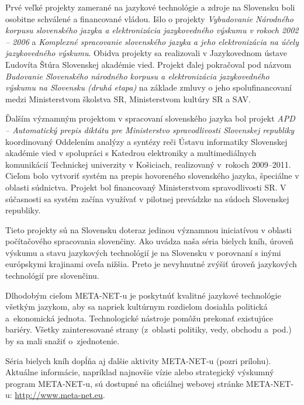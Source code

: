 \begin{multicols}{2}
Prvé veľké projekty zamerané na jazykové technológie a zdroje na Slovensku boli osobitne schválené a financované vládou. Išlo o projekty \emph{Vybudovanie Národného korpusu slovenského jazyka a elektronizácia jazykovedného výskumu v rokoch 2002 -- 2006} a \emph{Komplexné spracovanie slovenského jazyka a jeho elektronizácia na účely jazykovedného výskumu}. Obidva projekty sa realizovali v Jazykovednom ústave Ľudovíta Štúra Slovenskej akadémie vied. Projekt ďalej pokračoval pod názvom \emph{Budovanie Slovenského národného korpusu a elektronizácia jazykovedného výskumu na Slovensku (druhá etapa)} na základe zmluvy o jeho spolufinancovaní medzi Ministerstvom školstva SR, Ministerstvom kultúry SR a SAV.

Ďalším významným projektom v spracovaní slovenského jazyka bol projekt \emph{APD
--  Automatický prepis diktátu pre Ministerstvo spravodlivosti Slovenskej
republiky} koordinovaný Oddelením analýzy a syntézy reči Ústavu informatiky
Slovenskej akadémie vied v spolupráci s Katedrou elektroniky a multimediálnych
komunikácií Technickej univerzity v Košiciach, realizovaný v~rokoch
2009--2011. Cieľom bolo vytvoriť systém na prepis hovoreného
slovenského jazyka, špeciálne v oblasti súdnictva. Projekt bol financovaný
Ministerstvom spravodlivosti SR. V súčasnosti sa systém začína
využívať v pilotnej prevádzke na súdoch Slovenskej republiky. 

Tieto projekty sú na Slovensku doteraz jedinou významnou iniciatívou v oblasti počítačového spracovania slovenčiny.
Ako uvádza naša séria bielych kníh, úroveň výskumu a stavu jazykových technológií je na Slovensku v porovnaní s inými európskymi krajinami oveľa nižšia. Preto je nevyhnutné zvýšiť úroveň jazykových technológií pre slovenčinu.

Dlhodobým cieľom META-NET-u je pos\-kyt\-núť kvalitné jazykové technológie všetkým jazykom, aby sa napriek kultúrnym rozdielom dosiahla politická a~ekonomická jednota. Technologické nástroje pomôžu prekonať existujúce bariéry. Všetky zainteresované strany (z~oblasti politiky, vedy, obchodu a~pod.) by sa mali snažiť o~zjednotenie.


Séria bielych kníh dopĺňa aj ďalšie aktivity META-NET-u (pozri prílohu). Aktuálne informácie, napríklad najnovšie vízie alebo strategický výskumný program META-NET-u, sú dostupné na oficiálnej webovej stránke META-NET-u: \url{http://www.meta-net.eu}.
\end{multicols}


